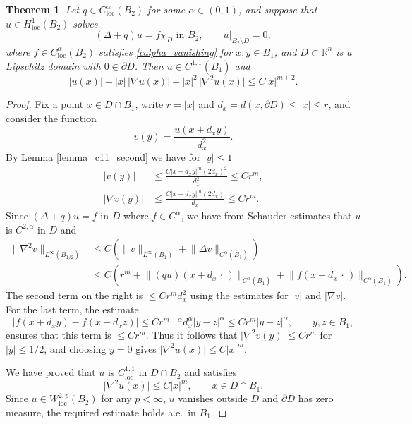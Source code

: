 \documentclass[11pt,a4paper]{amsart}
\newtheorem{Theorem}{Theorem}[section]
\theoremstyle{definition}
\numberwithin{equation}{section}
\newcommand{\mR}{\mathbb{R}}                    %
\newcommand{\abs}[1]{\lvert #1 \rvert}          %
\newcommand{\norm}[1]{\lVert #1 \rVert}         %
\newcommand{\ol}[1]{\overline{#1}}
\newcommand{\p}{\partial}
\begin{document}
\begin{Theorem} \label{thm_c11_regularity}
Let $q \in C^{\alpha}_{\mathrm{loc}}(B_2)$ for some $\alpha \in (0,1)$, and suppose that $u \in H^1_{\mathrm{loc}}(B_2)$ solves 
\[
(\Delta + q)u = f \chi_D \text{ in $B_2$}, \qquad u|_{B_2 \setminus \ol{D}} = 0,
\]
where $f \in C^{\alpha}_{\mathrm{loc}}(B_2)$ satisfies \eqref{calpha_vanishing} for $x, y \in \ol{B}_1$, 
and $D \subset \mR^n$ is a Lipschitz domain with $0 \in \p D$. Then $u \in C^{1,1}(\ol{B}_1)$ and 
\[
\abs{u(x)} + \abs{x} \, \abs{\nabla u(x)} + \abs{x}^2 \, \abs{\nabla^2 u(x)} \leq C \abs{x}^{m+2}.
\]
\end{Theorem}
\begin{proof}
Fix a point $x \in D \cap B_1$, write $r = \abs{x}$ and $d_x = d(x, \p D) \leq \abs{x} \leq r$, and consider the function 
\[
v(y) = \frac{u(x + d_x y)}{d_x^2}.
\]
By Lemma \ref{lemma_c11_second} we have for $\abs{y} \leq 1$ 
\begin{align*}
\abs{v(y)} &\leq \frac{C \abs{x + d_x y}^m (2d_x)^2}{d_x^2} \leq C r^m, \\
\abs{\nabla v(y)} &\leq \frac{C \abs{x + d_x y}^m (2d_x)}{d_x} \leq C r^m.
\end{align*}
Since $(\Delta+q)u = f$ in $D$ where $f \in C^{\alpha}$, we have from Schauder estimates that $u$ is $C^{2,\alpha}$ in $D$ and 
\begin{align*}
\norm{\nabla^2 v}_{L^{\infty}(B_{1/2})} &\leq C (\norm{v}_{L^{\infty}(B_1)} + \norm{\Delta v}_{C^{\alpha}(\ol{B}_1)}) \\
 &\leq C (r^m + \norm{(qu)(x + d_x \,\cdot\,)}_{C^{\alpha}(\ol{B}_1)} + \norm{f(x + d_x \,\cdot\,)}_{C^{\alpha}(\ol{B}_1)}).
\end{align*}
The second term on the right is $\leq C r^m d_x^2$ using the estimates for $\abs{v}$ and $\abs{\nabla v}$. For the last term, the estimate 
\[
\abs{f(x+d_x y) - f(x+d_x z)} \leq C r^{m-\alpha} d_x^{\alpha} \abs{y-z}^{\alpha} \leq C r^m \abs{y-z}^{\alpha}, \qquad y, z \in B_1,
\]
ensures that this term is $\leq C r^m$. Thus it follows that $\abs{\nabla^2 v(y)} \leq C r^m$ for $\abs{y} \leq 1/2$, and choosing $y=0$ gives $\abs{\nabla^2 u(x)} \leq C \abs{x}^m$.

We have proved that $u$ is $C^{1,1}_{\mathrm{loc}}$ in $D \cap B_2$ and satisfies 
\[
\abs{\nabla^2 u(x)} \leq C \abs{x}^{m}, \qquad x \in D \cap B_1.
\]
Since $u \in W^{2,p}_{\mathrm{loc}}(B_2)$ for any $p < \infty$, $u$ vanishes outside $D$ and $\p D$ has zero measure, the required estimate holds a.e.\ in $B_1$.
\end{proof}
\end{document}
